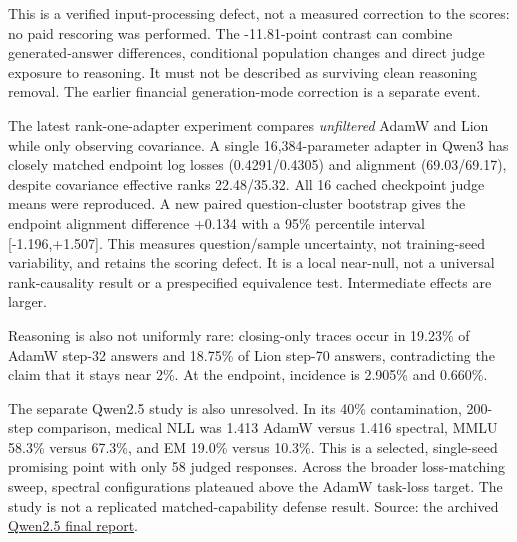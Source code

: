 \documentclass[
  british,
  10pt,
  a4paper,
]{article}
\begin{document}
This is a verified input-\allowbreak{}processing defect, not a measured
correction to the scores: no paid rescoring was performed. The
-\allowbreak{}11.\allowbreak{}81-\allowbreak{}point contrast can combine
generated-\allowbreak{}answer differences,\allowbreak{} conditional
population changes and direct judge exposure to reasoning. It must not
be described as surviving clean reasoning removal. The earlier financial
generation-\allowbreak{}mode correction is a separate event.

The latest rank-\allowbreak{}one-\allowbreak{}adapter experiment
compares \emph{unfiltered} AdamW and Lion while only observing
covariance.\allowbreak{} A single
16,\allowbreak{}384-\allowbreak{}parameter adapter in Qwen3 has closely
matched endpoint log losses
(0.\allowbreak{}4291/\allowbreak{}0.\allowbreak{}4305) and alignment
(69.\allowbreak{}03/\allowbreak{}69.\allowbreak{}17),\allowbreak{}
despite covariance effective ranks
22.\allowbreak{}48/\allowbreak{}35.\allowbreak{}32.\allowbreak{} All 16
cached checkpoint judge means were reproduced.\allowbreak{} A new paired
question-\allowbreak{}cluster bootstrap gives the endpoint alignment
difference +0.134 with a 95\% percentile interval
[-\allowbreak{}1.\allowbreak{}196,\allowbreak{}+1.\allowbreak{}507].\allowbreak{}
This measures question/\allowbreak{}sample uncertainty,\allowbreak{} not
training-\allowbreak{}seed variability,\allowbreak{} and retains the
scoring defect. It is a local near-null, not a universal
rank-\allowbreak{}causality result or a prespecified equivalence test.
Intermediate effects are larger.

Reasoning is also not uniformly rare: closing-\allowbreak{}only traces
occur in 19.23\% of AdamW step-32 answers and 18.75\% of Lion step-70
answers, contradicting the claim that it stays near 2\%. At the
endpoint, incidence is 2.905\% and 0.660\%.

The separate Qwen2.5 study is also unresolved.\allowbreak{} In its 40\%
contaminatio\allowbreak{}n,\allowbreak{} 200-step
comparison,\allowbreak{} medical NLL was 1.413 AdamW versus 1.416
spectral, MMLU 58.3\% versus 67.3\%, and EM 19.0\% versus 10.3\%. This
is a selected, single-\allowbreak{}seed promising point with only 58
judged responses. Across the broader loss-\allowbreak{}matching sweep,
spectral configurations plateaued above the AdamW task-loss target. The
study is not a replicated matched-\allowbreak{}capability defense
result. Source: the archived
\href{../../../../../../big/researcher-output/2026-08-02-spectral-optimizer-for-noise-reduction-on-em-data/REPORT.md}{Qwen2.5
final report}.
\end{document}
